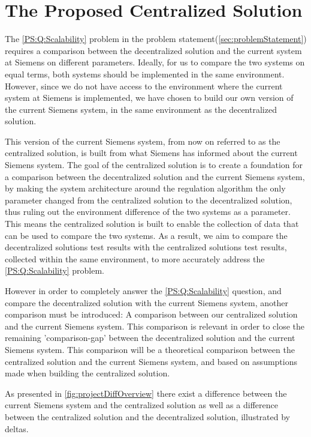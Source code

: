 \chapter{The Proposed Centralized Solution}\label{cha:existingSystem}

The \ref{PS:Q:Scalability} problem in the problem statement(\cref{sec:problemStatement}) requires a comparison between the decentralized solution and the current system at Siemens on different parameters. Ideally, for us to compare the two systems on equal terms, both systems should be implemented in the same environment. However, since we do not have access to the environment where the current system at Siemens is implemented, we have chosen to build our own version of the current Siemens system, in the same environment as the decentralized solution.

This version of the current Siemens system, from now on referred to as the centralized solution, is built from what Siemens has informed about the current Siemens system. The goal of the centralized solution is to create a foundation for a comparison between the decentralized solution and the current Siemens system, by making the system architecture around the regulation algorithm the only parameter changed from the centralized solution to the decentralized solution, thus ruling out the environment difference of the two systems as a parameter. This means the centralized solution is built to enable the collection of data that can be used to compare the two systems. As a result, we aim to compare the decentralized solutions test results with the centralized solutions test results, collected within the same environment, to more accurately address the \cref{PS:Q:Scalability} problem.

However in order to completely answer the \ref{PS:Q:Scalability} question, and compare the decentralized solution with the current Siemens system, another comparison must be introduced: A comparison between our centralized solution and the current Siemens system. This comparison is relevant in order to close the remaining 'comparison-gap' between the decentralized solution and the current Siemens system. This comparison will be a theoretical comparison between the centralized solution and the current Siemens system, and based on assumptions made when building the centralized solution.

As presented in \cref{fig:projectDiffOverview} there exist a difference between the current Siemens system and the centralized solution as well as a difference between the centralized solution and the decentralized solution, illustrated by deltas.

